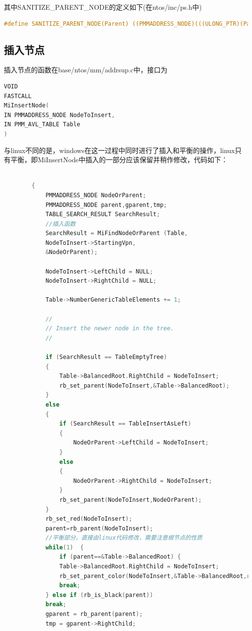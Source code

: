 其中SANITIZE\_PARENT\_NODE的定义如下(在ntos/inc/ps.h中)
 \begin{lstlisting}[language=C]
 #define SANITIZE_PARENT_NODE(Parent) ((PMMADDRESS_NODE)(((ULONG_PTR)(Parent)) & ~0x3))
 \end{lstlisting}
 \subsection{插入节点}
 插入节点的函数在base/ntos/mm/addrsup.c中，接口为
 \begin{lstlisting}[language=C]
VOID
FASTCALL
MiInsertNode(
IN PMMADDRESS_NODE NodeToInsert,
IN PMM_AVL_TABLE Table
)
\end{lstlisting}
与linux不同的是，windows在这一过程中同时进行了插入和平衡的操作，linux只有平衡，即MiInsertNode中插入的一部分应该保留并稍作修改，代码如下：
\begin{lstlisting}[language=C]

        {
            PMMADDRESS_NODE NodeOrParent;
            PMMADDRESS_NODE parent,gparent,tmp;
            TABLE_SEARCH_RESULT SearchResult;
            //插入函数
            SearchResult = MiFindNodeOrParent (Table,
            NodeToInsert->StartingVpn,
            &NodeOrParent);

            NodeToInsert->LeftChild = NULL;
            NodeToInsert->RightChild = NULL;

            Table->NumberGenericTableElements += 1;

            //
            // Insert the newer node in the tree.
            //

            if (SearchResult == TableEmptyTree) 
            {
                Table->BalancedRoot.RightChild = NodeToInsert;
                rb_set_parent(NodeToInsert,&Table->BalancedRoot);
            }
            else 
            {
                if (SearchResult == TableInsertAsLeft) 
                {
                    NodeOrParent->LeftChild = NodeToInsert;
                }
                else 
                {
                    NodeOrParent->RightChild = NodeToInsert;
                }
                rb_set_parent(NodeToInsert,NodeOrParent);
            }	
            rb_set_red(NodeToInsert);
            parent=rb_parent(NodeToInsert);
            //平衡部分，直接由linux代码修改，需要注意根节点的性质
            while(1)  {
                if (parent==&Table->BalancedRoot) {
                Table->BalancedRoot.RightChild = NodeToInsert;
                rb_set_parent_color(NodeToInsert,&Table->BalancedRoot,rb_black);
                break;
            } else if (rb_is_black(parent))
            break;
            gparent = rb_parent(parent);
            tmp = gparent->RightChild;


\end{lstlisting}
